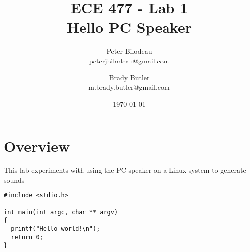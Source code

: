 \documentclass{article}
\begin{document}
\title{ECE 477 - Lab 1\\
Hello PC Speaker}
\author{Peter Bilodeau\\
	peterjbilodeau@gmail.com\and
	Brady Butler\\
	m.brady.butler@gmail.com}
\date{\today}
\maketitle{}
\section*{Overview}
This lab experiments with using the PC speaker on a Linux system to generate sounds
\begin{lstlisting}[frame=single]
#include <stdio.h>

int main(int argc, char ** argv)
{
  printf("Hello world!\n");
  return 0;
}
\end{lstlisting}
\end{document}
